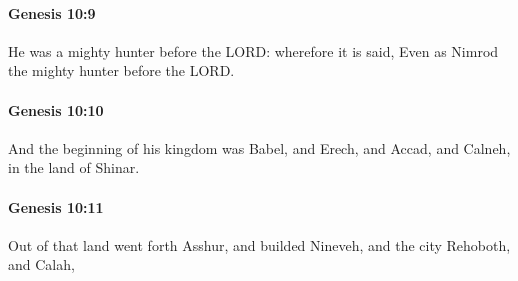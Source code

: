 		\paragraph{Genesis 10:9} %
			\label{GENESIS-10-9}

			He was a mighty hunter before the LORD: wherefore it is said, Even as Nimrod the mighty hunter before the LORD.


		\paragraph{Genesis 10:10} %
			\label{GENESIS-10-10}

			And the beginning of his kingdom was Babel, and Erech, and Accad, and Calneh, in the land of Shinar.


		\paragraph{Genesis 10:11} %
			\label{GENESIS-10-11}

			Out of that land went forth Asshur, and builded Nineveh, and the city Rehoboth, and Calah,


